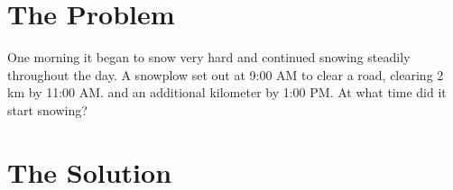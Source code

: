 \documentclass[a4paper,12pt]{article}
\begin{document}
\section{The Problem}
\begin{framed}
    \noindent One morning it began to snow very hard and continued snowing steadily throughout the day. A snowplow set out at 9:00 AM to clear a road, clearing 2 \unit{\kilo\meter} by 11:00 AM. and an additional kilometer by 1:00 PM. At what time did it start snowing?
\end{framed}
\section{The Solution}

    
    

\newpage \printbibliography
\end{document}
